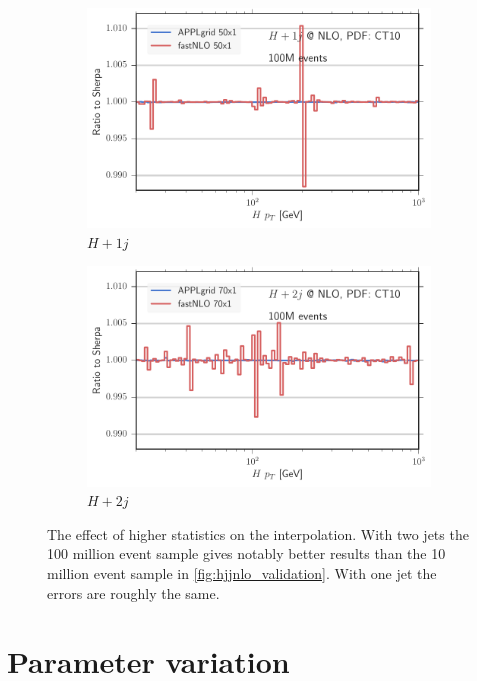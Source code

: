 \begin{figure}
	\centering
	\begin{subfigure}[]{0.49\textwidth}
		\includegraphics[width=\textwidth]{images/hjnlo_hpt_100m.pdf}
		\caption{$H + 1j$}
	\end{subfigure}
	\hfill
	\begin{subfigure}[]{0.49\textwidth}
		\includegraphics[width=\textwidth]{images/hjjnlo_hpt_100m.pdf}
		\caption{$H + 2j$}
	\end{subfigure}
	\caption{The effect of higher statistics on the interpolation.
				With two jets the 100 million event sample gives notably better results than the 10 million event sample in \cref{fig:hjjnlo_validation}.
				With one jet the errors are roughly the same.}
	\label{fig:hpt_100m}
\end{figure}
%
\section{Parameter variation}

